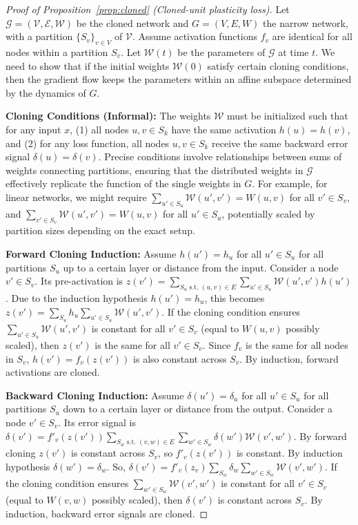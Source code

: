 \documentclass{article}
\begin{document}
\begin{proof}[Proof of Proposition~\ref{prop:cloned} (Cloned-unit plasticity loss)]
    Let $\mathcal{G}=(\mathcal{V},\mathcal{E},\mathcal{W})$ be the cloned network and $G=(V,E,W)$ the narrow network, with a partition $\{S_v\}_{v\in V}$ of $\mathcal{V}$. Assume activation functions $f_v$ are identical for all nodes within a partition $S_v$. Let $\mathcal{W}(t)$ be the parameters of $\mathcal{G}$ at time $t$. We need to show that if the initial weights $\mathcal{W}(0)$ satisfy certain cloning conditions, then the gradient flow keeps the parameters within an affine subspace determined by the dynamics of $G$.

    \textbf{Cloning Conditions (Informal):} The weights $\mathcal{W}$ must be initialized such that for any input $x$, (1) all nodes $u, v \in S_k$ have the same activation $h(u)=h(v)$, and (2) for any loss function, all nodes $u, v \in S_k$ receive the same backward error signal $\delta(u)=\delta(v)$. Precise conditions involve relationships between sums of weights connecting partitions, ensuring that the distributed weights in $\mathcal{G}$ effectively replicate the function of the single weights in $G$. For example, for linear networks, we might require $\sum_{u' \in S_u} \mathcal{W}(u', v') = W(u,v)$ for all $v' \in S_v$, and $\sum_{v' \in S_v} \mathcal{W}(u', v') = W(u,v)$ for all $u' \in S_u$, potentially scaled by partition sizes depending on the exact setup.

    \textbf{Forward Cloning Induction:} Assume $h(u') = h_u$ for all $u' \in S_u$ for all partitions $S_u$ up to a certain layer or distance from the input. Consider a node $v' \in S_v$. Its pre-activation is $z(v') = \sum_{S_u \text{ s.t. } (u,v)\in E} \sum_{u' \in S_u} \mathcal{W}(u', v') h(u')$. Due to the induction hypothesis $h(u')=h_u$, this becomes $z(v') = \sum_{S_u} h_u \sum_{u' \in S_u} \mathcal{W}(u', v')$. If the cloning condition ensures $\sum_{u' \in S_u} \mathcal{W}(u', v')$ is constant for all $v' \in S_v$ (equal to $W(u,v)$ possibly scaled), then $z(v')$ is the same for all $v' \in S_v$. Since $f_v$ is the same for all nodes in $S_v$, $h(v') = f_v(z(v'))$ is also constant across $S_v$. By induction, forward activations are cloned.

    \textbf{Backward Cloning Induction:} Assume $\delta(u') = \delta_u$ for all $u' \in S_u$ for all partitions $S_u$ down to a certain layer or distance from the output. Consider a node $v' \in S_v$. Its error signal is $\delta(v') = f'_v(z(v')) \sum_{S_w \text{ s.t. } (v,w)\in E} \sum_{w' \in S_w} \delta(w') \mathcal{W}(v', w')$. By forward cloning $z(v')$ is constant across $S_v$, so $f'_v(z(v'))$ is constant. By induction hypothesis $\delta(w')=\delta_w$. So, $\delta(v') = f'_v(z_v) \sum_{S_w} \delta_w \sum_{w' \in S_w} \mathcal{W}(v', w')$. If the cloning condition ensures $\sum_{w' \in S_w} \mathcal{W}(v', w')$ is constant for all $v' \in S_v$ (equal to $W(v,w)$ possibly scaled), then $\delta(v')$ is constant across $S_v$. By induction, backward error signals are cloned.


\end{proof}
\end{document}
